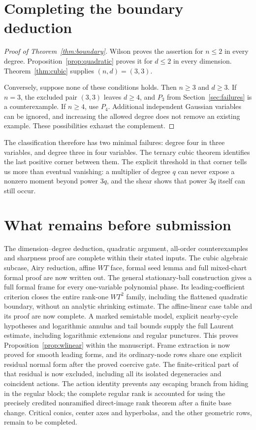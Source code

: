 \documentclass[11pt]{article}
\theoremstyle{definition}\newtheorem{definition}[theorem]{Definition}
\theoremstyle{remark}\newtheorem{remark}[theorem]{Remark}
\begin{document}
\section{Completing the boundary deduction}
\begin{proof}[Proof of Theorem~\ref{thm:boundary}]
Wilson proves the assertion for $n\leq2$ in every degree.
Proposition~\ref{prop:quadratic} proves it for $d\leq2$ in every
dimension. Theorem~\ref{thm:cubic} supplies $(n,d)=(3,3)$.

Conversely, suppose none of these conditions holds. Then $n\geq3$
and $d\geq3$. If $n=3$, the excluded pair $(3,3)$ leaves $d\geq4$,
and $P_3$ from Section~\ref{sec:failures} is a counterexample.
If $n\geq4$, use $P_4$. Additional independent Gaussian variables can
be ignored, and increasing the allowed degree does not remove an
existing example. These possibilities exhaust the complement.
\end{proof}

The classification therefore has two minimal failures: degree four
in three variables, and degree three in four variables. The ternary
cubic theorem identifies the last positive corner between them.
The explicit threshold in that corner tells us more than eventual
vanishing: a multiplier of degree $q$ can never expose a nonzero
moment beyond power $3q$, and the shear shows that power $3q$ itself
can still occur.

\section*{What remains before submission}
The dimension--degree deduction, quadratic argument, all-order
counterexamples and sharpness proof are complete within their stated
inputs. The cubic algebraic subcase, Airy reduction, affine $WT$ face,
formal seed lemma and full mixed-chart formal proof are now written out.
The general stationary-ball construction gives a full formal frame
for every one-variable polynomial phase. Its leading-coefficient
criterion closes the entire rank-one $WT^2$ family, including the
flattened quadratic boundary, without an analytic shrinking estimate.
The affine-linear case table and its proof are now complete.
A marked semistable model, explicit nearby-cycle hypotheses and
logarithmic annulus and tail bounds supply the full Laurent estimate,
including logarithmic extensions and regular punctures. This proves
Proposition~\ref{prop:wlinear} within the manuscript. Frame extraction
is now proved for smooth leading forms, and its ordinary-node rows
share one explicit residual normal form after the proved coercive gate.
The finite-critical part of that residual is now excluded, including all
its isolated degeneracies and coincident actions. The action identity
prevents any escaping branch from hiding in the regular block; the
complete regular rank is accounted for using the precisely credited
nonramified direct-image rank theorem after a finite base change.
Critical conics, center axes and hyperbolas, and the other geometric
rows, remain to be completed.
\end{document}
